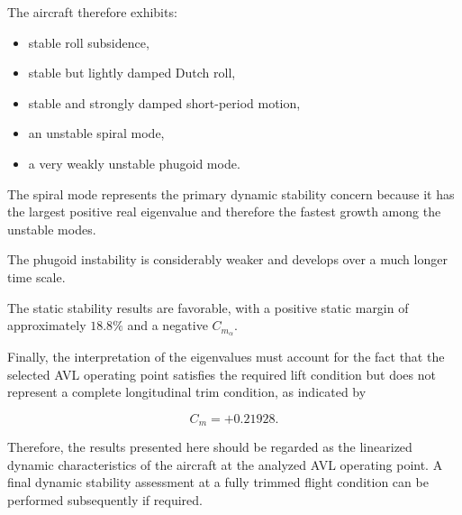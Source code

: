 \documentclass[11pt,a4paper]{article}
\begin{document}
The aircraft therefore exhibits:

\begin{itemize}
    \item stable roll subsidence,
    \item stable but lightly damped Dutch roll,
    \item stable and strongly damped short-period motion,
    \item an unstable spiral mode,
    \item a very weakly unstable phugoid mode.
\end{itemize}

The spiral mode represents the primary dynamic stability concern because
it has the largest positive real eigenvalue and therefore the fastest
growth among the unstable modes.

The phugoid instability is considerably weaker and develops over a much
longer time scale.

The static stability results are favorable, with a positive static margin
of approximately $18.8\%$ and a negative $C_{m_\alpha}$.

Finally, the interpretation of the eigenvalues must account for the fact
that the selected AVL operating point satisfies the required lift
condition but does not represent a complete longitudinal trim condition,
as indicated by

\begin{equation}
C_m=+0.21928.
\end{equation}

Therefore, the results presented here should be regarded as the
linearized dynamic characteristics of the aircraft at the analyzed AVL
operating point. A final dynamic stability assessment at a fully trimmed
flight condition can be performed subsequently if required.

\end{document}
